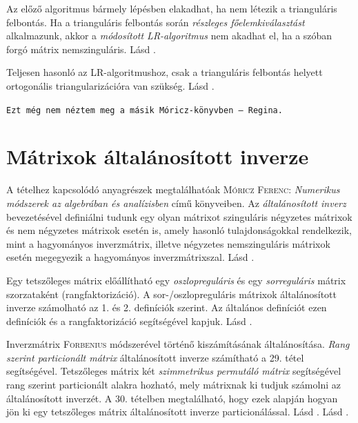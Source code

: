 \documentclass[DIV=15,appendixprefix]{scrreprt}
\theoremstyle{definition}
\theoremstyle{remark}
\begin{document}
Az előző algoritmus bármely lépésben elakadhat, ha nem létezik a trianguláris felbontás. Ha a
trianguláris felbontás során \emph{részleges főelemkiválasztást} alkalmazunk, akkor a
\emph{módosított LR-algoritmus} nem akadhat el, ha a szóban forgó mátrix nemszinguláris.
%
Lásd \cite[I. fejezet, 4. szakasz]{Moricz1997}.

Teljesen hasonló az LR-algoritmushoz, csak a trianguláris felbontás helyett ortogonális
triangularizációra van szükség.
%
Lásd \cite[II. fejezet, 5. szakasz]{Moricz2008}.

\texttt{Ezt még nem néztem meg a másik Móricz-könyvben -- Regina.}
%
\section{Mátrixok általánosított inverze}
A tételhez kapcsolódó anyagrészek megtalálhatóak \textsc{Móricz Ferenc}: \emph{Numerikus módszerek
az algebrában és analízisben} \cite[II. fejezet]{Moricz1997} című könyveiben.
%
Az \emph{általánosított inverz} bevezetésével definiálni tudunk egy olyan mátrixot szinguláris
négyzetes mátrixok és nem négyzetes mátrixok esetén is, amely hasonló tulajdonságokkal rendelkezik,
mint a hagyományos inverzmátrix, illetve négyzetes nemszinguláris mátrixok esetén megegyezik a
hagyományos inverzmátrixszal.
%
Lásd \cite[II. fejezet, 6. szakasz]{Moricz1997}.

Egy tetszőleges mátrix előállítható egy \emph{oszlopreguláris} és egy \emph{sorreguláris} mátrix
szorzataként (rangfaktorizáció). A sor-/oszlopreguláris mátrixok általánosított inverze számolható
az 1. és 2. definíciók szerint. Az általános definíciót ezen definíciók és a rangfaktorizáció
segítségével kapjuk.
%
Lásd \cite[II. fejezet, 8. szakasz]{Moricz1997}.

Inverzmátrix \textsc{Forbenius} módszerével történő kiszámításának általánosítása. \emph{Rang
szerint particionált mátrix} általánosított inverze  számítható a 29. tétel
segítségével. Tetszőleges mátrix két \emph{szimmetrikus permutáló mátrix} segítségével rang szerint
particionált alakra hozható, mely mátrixnak ki tudjuk számolni az általánosított inverzét. A 30.
tételben megtalálható, hogy ezek alapján hogyan jön ki egy tetszőleges mátrix általánosított inverze
particionálással.
%
Lásd \cite[II. fejezet, 8. szakasz utolsó megjegyzése]{Moricz1997}.
%
Lásd \cite[II. fejezet, 7. szakasz]{Moricz1997}.
\end{document}
